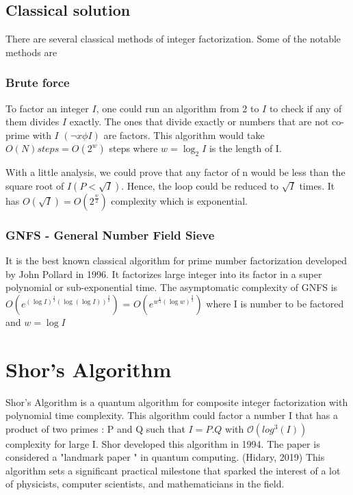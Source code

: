
\subsection{Classical solution}
There are several classical methods of integer factorization. Some of the notable methods are
\subsubsection{Brute force}
To factor an integer $I$, one could run an algorithm from 2 to $I$ to check if any of them divides $I$ exactly. The ones that divide exactly or numbers that are not co-prime with $I$ $(\neg x \phi I)$ are factors. This algorithm would take $O(N) steps = O(2^w)$ steps where $w= \log_2 I$ is the length of I.

With a little analysis, we could prove that any factor of n would be less than the square root of $ I(P<\sqrt{ I})$. Hence, the loop could be reduced to $\sqrt{ I}$ times. It has $O(\sqrt{ I}) = O(2^{\frac{w}{2}})$ complexity which is exponential.

\subsubsection{GNFS - General Number Field Sieve}
It is the best known classical algorithm for prime number factorization developed by John Pollard in 1996. It factorizes large integer into its factor in a super polynomial or sub-exponential time. The asymptomatic complexity of GNFS is $ O(e^{{(\log I)}^{\frac{1}{3}} (\log(\log I))^{\frac{2}{3}}})$ = $O(e^{w^{\frac{1}{3}} (\log w)^{\frac{2}{3}}})$ where I is number to be factored and $w= \log I$\cite{hamdi_2014}



\section{Shor's Algorithm} 
Shor's Algorithm is a quantum algorithm for composite integer factorization with polynomial time complexity.\cite{shor1994} This algorithm could factor a number I that has a product of two primes : P and Q such that $I=P.Q$ with $\mathcal{O}(log^3(I))$ complexity for large I. Shor developed this algorithm in 1994. The paper is considered a "landmark paper " in quantum computing.\cite{Hidary} (Hidary, 2019) This algorithm sets a significant practical milestone that sparked the interest of a lot of physicists, computer scientists, and mathematicians in the field.

